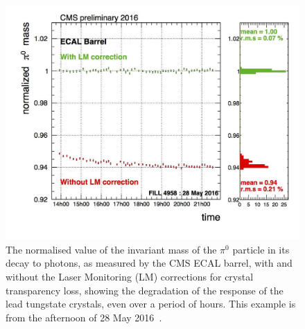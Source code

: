 \begin{figure}[h]
\centering
\includegraphics[width=1.0\textwidth]{detectorFigures/pi0_EB_plus_1.jpg}
\caption[The normalised value of the invariant mass of the $\pi^0$ particle in its decay to photons, as measured by the CMS ECAL barrel, with and without the Laser Monitoring (LM) corrections for crystal transparency loss, showing the degradation of the response of the lead tungstate crystals, even over a period of hours. This example is from the afternoon of 28 May 2016\quad\cite{CMSECALPublic}.]{The normalised value of the invariant mass of the $\pi^0$ particle in its decay to photons, as measured by the CMS ECAL barrel, with and without the Laser Monitoring (LM) corrections for crystal transparency loss, showing the degradation of the response of the lead tungstate crystals, even over a period of hours. This example is from the afternoon of 28 May 2016~\cite{CMSECALPublic}.}
\label{fig:cms:ecal:pizeroLMcorr}
\end{figure}

